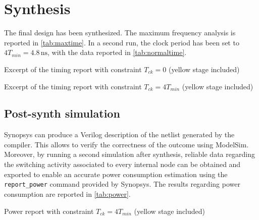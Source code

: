 \section{Synthesis}
The final design has been synthesized. The maximum frequency analysis is reported in \autoref{tab:maxtime}. In a second run, the clock period has been set to $4T_{min} = 4.8\,\textrm{ns}$, with the data reported in \autoref{tab:normaltime}.
\begin{table}
	\parbox[t]{0.52\textwidth}{
	\centering
	
	\caption{Excerpt of the timing report with constraint $T_{ck}=0$ (yellow stage included)}
	\label{tab:maxtime}
	}
\hfill
	\parbox[t]{0.52\textwidth}{
	\centering
	
	\caption{Excerpt of the timing report with constraint $T_{ck}=4T_{min}$ (yellow stage included)}
	\label{tab:normaltime}
}

\end{table}

\subsection{Post-synth simulation}
Synopsys can produce a Verilog description of the netlist generated by the compiler. This allows to verify the correctness of the outcome using ModelSim. Moreover, by running a second simulation after synthesis, reliable data regarding the switching activity associated to every internal node can be obtained and exported to enable an accurate power consumption estimation using the \texttt{report\_power} command provided by Synopsys. The results regarding power consumption are reported in \autoref{tab:power}.
\begin{table}
	\centering
	
	\caption{Power report with constraint $T_{ck}=4T_{min}$ (yellow stage included)}
	\label{tab:power}
\end{table}